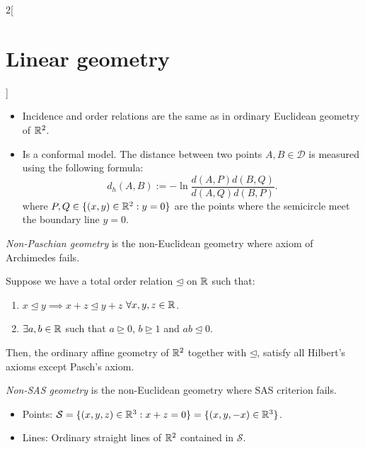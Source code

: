 \documentclass[../../../main.tex]{subfiles}
\begin{document}
\begin{multicols}{2}[\section{Linear geometry}]
\begin{definition}
\begin{itemize}
\begin{itemize}
              \item Incidence and order relations are the same as in ordinary Euclidean geometry of $\mathbb{R}^2$.
              \item Is a conformal model. The distance between two points $A,B\in\mathcal{D}$ is measured using the following formula: $$d_h(A,B):=-\ln\frac{d(A,P)d(B,Q)}{d(A,Q)d(B,P)}.$$ where $P,Q\in\{(x,y)\in\mathbb{R}^2:y=0\}$ are the points where the semicircle meet the boundary line $y=0$.
            \end{itemize}
            \begin{center}
              \begin{minipage}{\linewidth}
                \centering
                
              \end{minipage}
            \end{center}
    \end{itemize}
  \end{definition}
  \begin{definition}
    \textit{Non-Paschian geometry} is the non-Euclidean geometry where axiom of Archimedes fails.
  \end{definition}
  \begin{prop}
    Suppose we have a total order relation $\unlhd$ on $\mathbb{R} $ such that:
    \begin{enumerate}
      \item $x\unlhd y\implies x+z\unlhd y+z$ $\forall x,y,z\in\mathbb{R} $.
      \item $\exists a,b\in\mathbb{R}$ such that $a\unrhd 0$, $b\unrhd 1$ and $ab\unlhd 0$.
    \end{enumerate}
    Then, the ordinary affine geometry of $\mathbb{R}^2$ together with $\unlhd$, satisfy all Hilbert's axioms except Pasch's axiom.
  \end{prop}
  \begin{definition}
    \textit{Non-SAS geometry} is the non-Euclidean geometry where SAS criterion fails.
  \end{definition}
  \begin{prop}
    \hfill
    \begin{itemize}
      \item Points: $\mathcal{S}=\{(x,y,z)\in\mathbb{R}^3:x+z=0\}=\{(x,y,-x)\in\mathbb{R}^3\}$.
      \item Lines: Ordinary straight lines of $\mathbb{R}^2$ contained in $\mathcal{S}$.

\end{itemize}
\end{prop}
\end{multicols}
\end{document}
